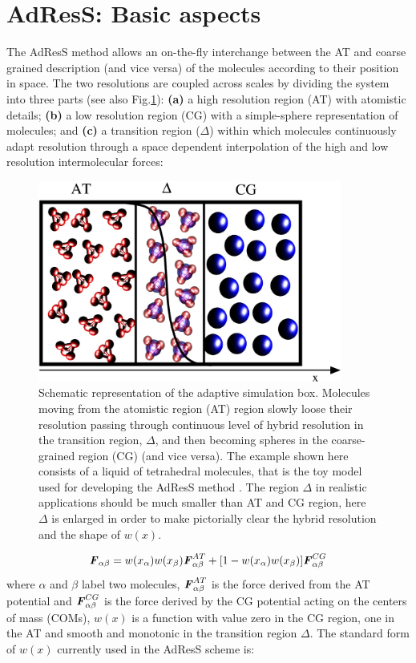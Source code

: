 \documentclass[aps,pre,preprint]{revtex4}
\renewcommand{\v}[1]{\textbf{\textit{#1}}}
\begin{document}
\section{AdResS: Basic aspects}
The  AdResS method allows an on-the-fly interchange between the AT and coarse grained description (and vice versa) of the molecules according to their position in space. 
The two resolutions are coupled across scales by dividing the system into three parts (see also Fig.\ref{adapt}): {\bf (a)}
a high resolution region (AT) with atomistic details; {\bf (b)} a low resolution region (CG) with a simple-sphere
representation of molecules; and {\bf (c)} a transition region ($\Delta$) within which molecules continuously
adapt resolution through a space dependent interpolation of the high and low resolution intermolecular
forces:
\begin{figure}
  \centering
  \includegraphics[angle=0,width=10cm]{adapt-pic.eps}
  \caption{Schematic representation of the adaptive simulation box. Molecules moving from the atomistic region (AT) region slowly loose their resolution passing through continuous level of hybrid resolution in the transition region, $\Delta$, and then becoming spheres in the coarse-grained region (CG) (and vice versa). The example shown here consists of a liquid of tetrahedral molecules, that is the toy model used for developing the AdResS method \cite{jcp}. The region $\Delta$ in realistic applications should be much smaller than AT and CG region, here $\Delta$ is enlarged in order to make pictorially clear the hybrid resolution and the shape of $w(x)$.}
  \label{adapt}
\end{figure} 
\begin{equation}
{\v F}_{\alpha \beta}=w(x_\alpha)w(x_\beta){\v F}_{\alpha\beta}^{AT}+[1-w(x_\alpha)w(x_\beta)]{\v F}^{CG}_{\alpha\beta}
\label{force}
\end{equation}
where $\alpha$ and $\beta$ label two molecules, ${\v F}_{\alpha\beta}^{AT}$ is the force derived from the AT potential and ${\v F}^{CG}_{\alpha\beta}$ is the force derived by the CG potential acting on the centers of mass (COMs), $w(x)$ is a function with value zero in the CG region, one in the AT and smooth and monotonic in the transition region $\Delta$. The standard form of $w(x)$ currently used in the AdResS scheme is:
\end{document}
